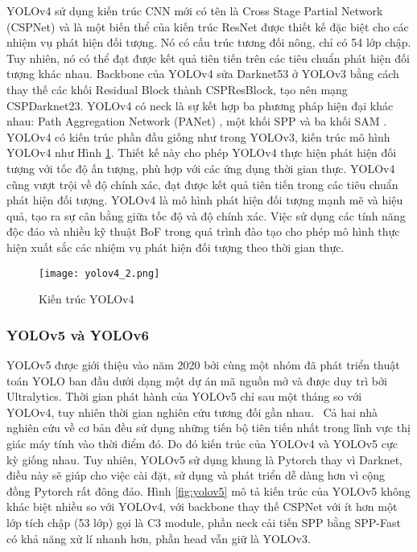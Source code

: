 \documentclass[../the.tex]{subfiles}
\begin{document}
{\fontsize{13}{12} \selectfont

YOLOv4 sử dụng kiến trúc CNN mới có tên là Cross Stage Partial Network (CSPNet) \cite{wang2019cspnet} và là một biến thể của kiến trúc ResNet được thiết kế đặc biệt cho các nhiệm vụ phát hiện đối tượng. Nó có cấu trúc tương đối nông, chỉ có 54 lớp chập. Tuy nhiên, nó có thể đạt được kết quả tiên tiến trên các tiêu chuẩn phát hiện đối tượng khác nhau.
Backbone của YOLOv4 sửa Darknet53 ở YOLOv3 bằng cách thay thế các khối Residual Block thành CSPResBlock, tạo nên mạng CSPDarknet23.
YOLOv4 có neck là sự kết hợp ba phương pháp hiện đại khác nhau: Path Aggregation Network (PANet) \cite{liu2018path}, một khối SPP \cite{He_2014} và ba khối SAM \cite{woo2018cbam}.
YOLOv4 có kiến trúc phần đầu giống như trong YOLOv3, kiến trúc mô hình YOLOv4 như Hình \ref{fig:yolov4_2}.
Thiết kế này cho phép YOLOv4 thực hiện phát hiện đối tượng với tốc độ ấn tượng, phù hợp với các ứng dụng thời gian thực. YOLOv4 cũng vượt trội về độ chính xác, đạt được kết quả tiên tiến trong các tiêu chuẩn phát hiện đối tượng.
YOLOv4 là mô hình phát hiện đối tượng mạnh mẽ và hiệu quả, tạo ra sự cân bằng giữa tốc độ và độ chính xác. Việc sử dụng các tính năng độc đáo và nhiều kỹ thuật BoF trong quá trình đào tạo cho phép mô hình thực hiện xuất sắc các nhiệm vụ phát hiện đối tượng theo thời gian thực.

}

\begin{figure}[H]
	\centering
	\texttt{[image: yolov4\_2.png]}
	\caption{Kiến trúc YOLOv4}
	\label{fig:yolov4_2}
\end{figure}

\subsubsection{YOLOv5 và YOLOv6}
{\fontsize{13}{12} \selectfont

	YOLOv5 được giới thiệu vào năm 2020 bởi cùng một nhóm đã phát triển thuật toán YOLO ban đầu dưới dạng một dự án mã nguồn mở và được duy trì bởi Ultralytics.
	Thời gian phát hành của YOLOv5 chỉ sau một tháng so với YOLOv4, tuy nhiên thời gian nghiên cứu tương đối gần nhau. \
	Cả hai nhà nghiên cứu về cơ bản đều sử dụng những tiến bộ tiên tiến nhất trong lĩnh vực thị giác máy tính vào thời điểm đó. Do đó kiến trúc của YOLOv4 và YOLOv5 cực kỳ giống nhau.
	Tuy nhiên, YOLOv5 sử dụng khung là Pytorch thay vì Darknet, điều này sẽ giúp cho việc cài đặt, sử dụng và phát triển dễ dàng hơn vì cộng đồng Pytorch rất đông đảo.
	Hình \ref{fig:yolov5} mô tả kiến trúc của YOLOv5 không khác biệt nhiều so với YOLOv4, với backbone thay thế CSPNet với ít hơn một lớp tích chập (53 lớp) gọi là C3 module, phần neck cải tiến SPP bằng SPP-Fast có khả năng xử lí nhanh hơn,
	phần head vẫn giữ là YOLOv3.

}
\end{document}
